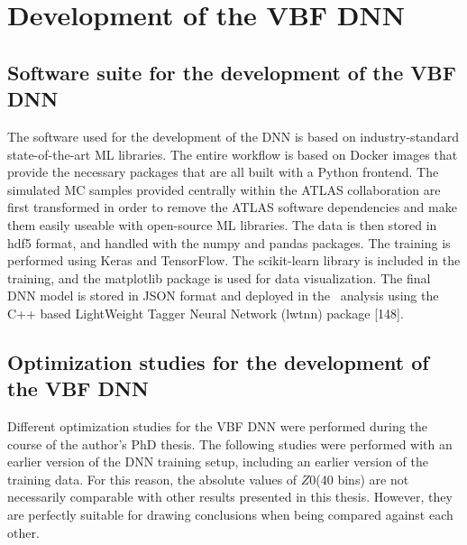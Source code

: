 \chapter{Development of the VBF DNN}
\label{app:chap:DNN}

\section{Software suite for the development of the VBF DNN}
\label{app:dnn:software-suite}
The software used for the development of the DNN is based on industry-standard state-of-the-art ML libraries. 
The entire workflow is based on Docker images that provide the necessary packages that are all built with a Python frontend. The simulated MC samples provided centrally within the ATLAS collaboration are first transformed in order to remove the ATLAS software dependencies and make them easily useable with open-source ML libraries. The data is then stored in hdf5 format, and handled with the numpy and pandas packages. The training is performed using Keras and TensorFlow. The scikit-learn library is included in the training, and the matplotlib package is used for data visualization. The final DNN model is stored in JSON format and deployed in the \HWW\ analysis using the C++ based LightWeight Tagger Neural Network (lwtnn) package [148].


\section{Optimization studies for the development of the VBF DNN}
\label{app:dnn:opt-studies}

Different optimization studies for the VBF DNN were performed during the course of the author's PhD thesis.
The following studies were performed with an earlier version of the DNN training setup, including an earlier version of the training data. For this reason, the absolute values of $Z0$(40 bins) are not necessarily comparable with other results presented in this thesis. However, they are perfectly suitable for drawing conclusions when being compared against each other.

